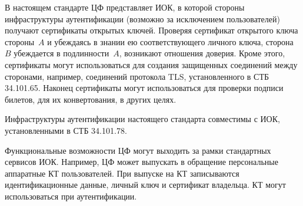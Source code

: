 В настоящем стандарте ЦФ представляет ИОК, в которой стороны инфраструктуры 
аутентификации (возможно за исключением пользователей) получают сертификаты 
открытых ключей. 
%
Проверяя сертификат открытого ключа стороны~$A$ и убеждаясь в знании ею 
соответствующего личного ключа, сторона~$B$ убеждается в подлинности~$A$,
возникают отношения доверия.
%
Кроме этого, сертификаты могут использоваться для создания защищенных 
соединений между сторонами, например, соединений протокола TLS, 
установленного в СТБ 34.101.65. 
%
Наконец сертификаты могут использоваться для проверки подписи билетов, для их 
конвертования, в других целях.  

Инфраструктуры аутентификации настоящего стандарта совместимы с ИОК, 
установленными в СТБ 34.101.78.

Функциональные возможности ЦФ могут выходить за рамки стандартных сервисов ИОК. 
Например, ЦФ может выпускать в обращение персональные аппаратные КТ 
пользователей. При выпуске на КТ записываются идентификационные данные, личный 
ключ и сертификат владельца. КТ могут использоваться при аутентификации.

